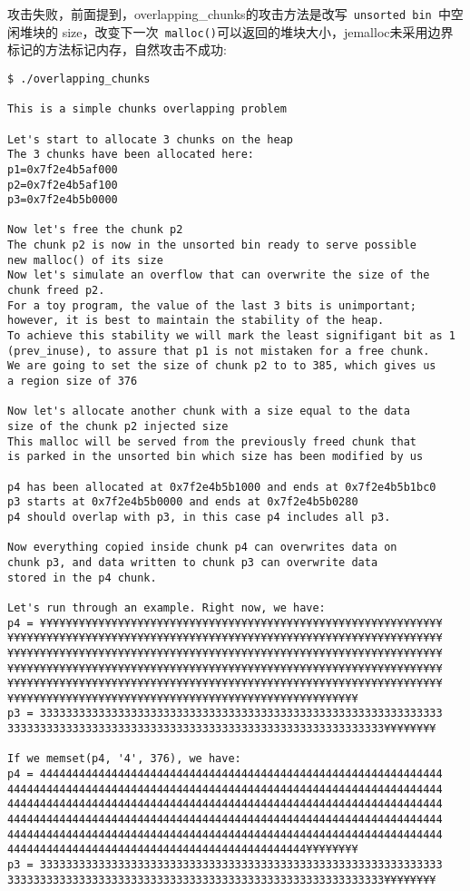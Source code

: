 攻击失败，前面提到，overlapping\_chunks的攻击方法是改写\verb+ unsorted bin +中空闲堆块的 size，改变下一次\verb+ malloc()+可以返回的堆块大小，jemalloc未采用边界标记的方法标记内存，自然攻击不成功:
\begin{verbatim}
$ ./overlapping_chunks 

This is a simple chunks overlapping problem

Let's start to allocate 3 chunks on the heap
The 3 chunks have been allocated here:
p1=0x7f2e4b5af000
p2=0x7f2e4b5af100
p3=0x7f2e4b5b0000

Now let's free the chunk p2
The chunk p2 is now in the unsorted bin ready to serve possible
new malloc() of its size
Now let's simulate an overflow that can overwrite the size of the
chunk freed p2.
For a toy program, the value of the last 3 bits is unimportant; however, it is best to maintain the stability of the heap.
To achieve this stability we will mark the least signifigant bit as 1 (prev_inuse), to assure that p1 is not mistaken for a free chunk.
We are going to set the size of chunk p2 to to 385, which gives us
a region size of 376

Now let's allocate another chunk with a size equal to the data
size of the chunk p2 injected size
This malloc will be served from the previously freed chunk that
is parked in the unsorted bin which size has been modified by us

p4 has been allocated at 0x7f2e4b5b1000 and ends at 0x7f2e4b5b1bc0
p3 starts at 0x7f2e4b5b0000 and ends at 0x7f2e4b5b0280
p4 should overlap with p3, in this case p4 includes all p3.

Now everything copied inside chunk p4 can overwrites data on
chunk p3, and data written to chunk p3 can overwrite data
stored in the p4 chunk.

Let's run through an example. Right now, we have:
p4 = ¥¥¥¥¥¥¥¥¥¥¥¥¥¥¥¥¥¥¥¥¥¥¥¥¥¥¥¥¥¥¥¥¥¥¥¥¥¥¥¥¥¥¥¥¥¥¥¥¥¥¥¥¥¥¥¥¥¥¥¥¥¥
¥¥¥¥¥¥¥¥¥¥¥¥¥¥¥¥¥¥¥¥¥¥¥¥¥¥¥¥¥¥¥¥¥¥¥¥¥¥¥¥¥¥¥¥¥¥¥¥¥¥¥¥¥¥¥¥¥¥¥¥¥¥¥¥¥¥¥
¥¥¥¥¥¥¥¥¥¥¥¥¥¥¥¥¥¥¥¥¥¥¥¥¥¥¥¥¥¥¥¥¥¥¥¥¥¥¥¥¥¥¥¥¥¥¥¥¥¥¥¥¥¥¥¥¥¥¥¥¥¥¥¥¥¥¥
¥¥¥¥¥¥¥¥¥¥¥¥¥¥¥¥¥¥¥¥¥¥¥¥¥¥¥¥¥¥¥¥¥¥¥¥¥¥¥¥¥¥¥¥¥¥¥¥¥¥¥¥¥¥¥¥¥¥¥¥¥¥¥¥¥¥¥
¥¥¥¥¥¥¥¥¥¥¥¥¥¥¥¥¥¥¥¥¥¥¥¥¥¥¥¥¥¥¥¥¥¥¥¥¥¥¥¥¥¥¥¥¥¥¥¥¥¥¥¥¥¥¥¥¥¥¥¥¥¥¥¥¥¥¥
¥¥¥¥¥¥¥¥¥¥¥¥¥¥¥¥¥¥¥¥¥¥¥¥¥¥¥¥¥¥¥¥¥¥¥¥¥¥¥¥¥¥¥¥¥¥¥¥¥¥¥¥¥¥
p3 = 33333333333333333333333333333333333333333333333333333333333333
3333333333333333333333333333333333333333333333333333333333¥¥¥¥¥¥¥¥

If we memset(p4, '4', 376), we have:
p4 = 44444444444444444444444444444444444444444444444444444444444444
4444444444444444444444444444444444444444444444444444444444444444444
4444444444444444444444444444444444444444444444444444444444444444444
4444444444444444444444444444444444444444444444444444444444444444444
4444444444444444444444444444444444444444444444444444444444444444444
4444444444444444444444444444444444444444444444¥¥¥¥¥¥¥¥
p3 = 33333333333333333333333333333333333333333333333333333333333333
3333333333333333333333333333333333333333333333333333333333¥¥¥¥¥¥¥¥


\end{verbatim}
